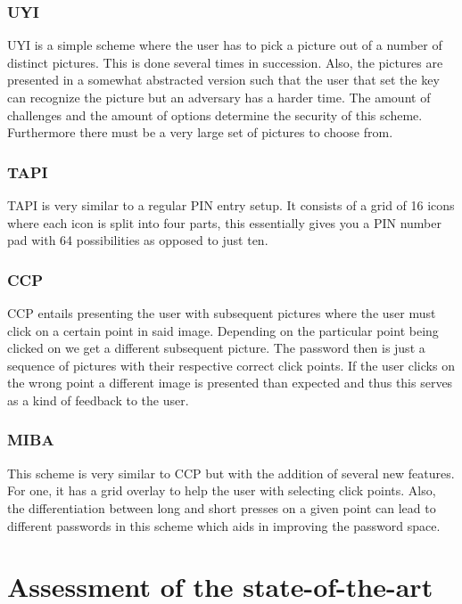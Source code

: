 \documentclass[conference, 12pt]{sty/IEEEtran}
\begin{document}
\subsubsection{UYI}
\label{sssec:uyi}

UYI is a simple scheme where the user has to pick a picture out of a number of distinct pictures.
This is done several times in succession.
Also, the pictures are presented in a somewhat abstracted version such that the user that set the key can recognize the picture but an adversary has a harder time.
The amount of challenges and the amount of options determine the security of this scheme.
Furthermore there must be a very large set of pictures to choose from.

\subsubsection{TAPI}
\label{sssec:tapi}

TAPI is very similar to a regular PIN entry setup.
It consists of a grid of 16 icons where each icon is split into four parts, this essentially gives you a PIN number pad with 64 possibilities as opposed to just ten.

\subsubsection{CCP}
\label{sssec:ccp}

CCP entails presenting the user with subsequent pictures where the user must click on a certain point in said image.
Depending on the particular point being clicked on we get a different subsequent picture.
The password then is just a sequence of pictures with their respective correct click points.
If the user clicks on the wrong point a different image is presented than expected and thus this serves as a kind of feedback to the user.

\subsubsection{MIBA}
\label{sssec:miba}

This scheme is very similar to CCP but with the addition of several new features.
For one, it has a grid overlay to help the user with selecting click points.
Also, the differentiation between long and short presses on a given point can lead to different passwords in this scheme which aids in improving the password space.

\section{Assessment of the state-of-the-art}
\label{sec:assessment_of_the_state_of_the_art}
\end{document}
